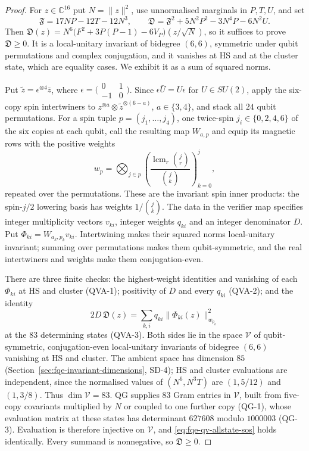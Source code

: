 \begin{proof}
For $z\in\mathbb C^{16}$ put $N=\lVert z\rVert^2$, use unnormalised marginals in $P,T,U$, and set
\[
 \mathfrak F=17NP-12T-12N^3,\qquad
 \mathfrak D=\mathfrak F^2+5N^2P^2-3N^4P-6N^2U.
\]
Then $\mathfrak D(z)=N^6\bigl(F^2+3P(P-1)-6V_P\bigr)(z/\sqrt N)$, so it suffices to prove $\mathfrak D\ge0$.
It is a local-unitary invariant of bidegree $(6,6)$, symmetric under qubit permutations and complex
conjugation, and it vanishes at HS and at the cluster state, which are equality cases. We exhibit it as a sum of
squared norms.

Put $\widetilde z=\epsilon^{\otimes4}\bar z$, where $\epsilon=\bigl(\begin{smallmatrix}0&1\\-1&0\end{smallmatrix}\bigr)$.
Since $\epsilon\bar U=U\epsilon$ for $U\in SU(2)$, apply the six-copy spin intertwiners to
$z^{\otimes a}\otimes\widetilde z^{\otimes(6-a)}$, $a\in\{3,4\}$, and stack all $24$ qubit permutations.
For a spin tuple $p=(j_1,\dots,j_4)$, one twice-spin $j_i\in\{0,2,4,6\}$ of the six copies at each qubit, call the resulting map $W_{a,p}$ and equip its magnetic rows with the positive weights
\[
 w_p=\bigotimes_{j\in p}\left(\frac{\operatorname{lcm}_{r}\binom jr}{\binom jk}\right)_{k=0}^{j},
\]
repeated over the permutations. These are the invariant spin inner products: the spin-$j/2$ lowering basis has weights $1/\binom jk$.
The data in the verifier map specifies integer multiplicity vectors $v_{ki}$, integer weights $q_{ki}$
and an integer denominator $D$. Put $\Phi_{ki}=W_{a_k,p_k}v_{ki}$.
Intertwining makes their squared norms local-unitary invariant; summing over permutations makes them
qubit-symmetric, and the real intertwiners and weights make them conjugation-even.

There are three finite checks: the highest-weight identities and vanishing of each $\Phi_{ki}$ at HS and
cluster (QVA-1); positivity of $D$ and every $q_{ki}$ (QVA-2); and the identity
\begin{equation}\label{eq:fqe-qv-allstate-sos}
 2D\,\mathfrak D(z)=\sum_{k,i}q_{ki}\lVert\Phi_{ki}(z)\rVert_{w_{p_k}}^2
\end{equation}
at the $83$ determining states (QVA-3).
Both sides lie in the space $\mathcal V$ of qubit-symmetric, conjugation-even local-unitary
invariants of bidegree $(6,6)$ vanishing at HS and cluster. The ambient space has dimension $85$
(Section~\ref{sec:fqe-invariant-dimensions}, SD-4); HS and cluster evaluations are independent,
since the normalised values of $(N^6,N^3T)$ are $(1,5/12)$ and $(1,3/8)$. Thus $\dim\mathcal V=83$.
QG supplies $83$ Gram entries in $\mathcal V$, built from five-copy covariants multiplied by $N$
or coupled to one further copy (QG-1), whose evaluation matrix at these states
has determinant $627608$ modulo $1000003$ (QG-3). Evaluation is therefore injective on $\mathcal V$,
and \eqref{eq:fqe-qv-allstate-sos} holds identically. Every summand is nonnegative, so $\mathfrak D\ge0$.
\end{proof}

